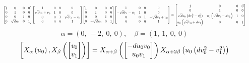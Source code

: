 \documentclass[11pt]{article}
\theoremstyle{definition}
\begin{document}
\[
\scaletoalign{\textwidth}{{\left[\begin{matrix}1 & 0 & 0 & 0\\0 & 1 & 0 & 0\\0 & 0 & 1 & 0\\0 & \sqrt{d} u_{0} & 0 & 1\end{matrix}\right]} {\left[\begin{matrix}1 & 0 & 0 & 0\\\sqrt{d} v_{1} + v_{0} & 1 & 0 & 0\\0 & 0 & 1 & \sqrt{d} v_{1} - v_{0}\\0 & 0 & 0 & 1\end{matrix}\right]} {\left[\begin{matrix}1 & 0 & 0 & 0\\0 & 1 & 0 & 0\\0 & 0 & 1 & 0\\0 & - \sqrt{d} u_{0} & 0 & 1\end{matrix}\right]} {\left[\begin{matrix}1 & 0 & 0 & 0\\- \sqrt{d} v_{1} - v_{0} & 1 & 0 & 0\\0 & 0 & 1 & - \sqrt{d} v_{1} + v_{0}\\0 & 0 & 0 & 1\end{matrix}\right]} = {\left[\begin{matrix}1 & 0 & 0 & 0\\0 & 1 & 0 & 0\\\sqrt{d} u_{0} \left(d v_{1}^{2} - v_{0}^{2}\right) & u_{0} \left(\sqrt{d} v_{0} - d v_{1}\right) & 1 & 0\\u_{0} \left(\sqrt{d} v_{0} + d v_{1}\right) & 0 & 0 & 1\end{matrix}\right]}}
\]
\[
\alpha = \left( 0, \  -2, \  0, \  0\right), \quad \beta = \left( 1, \  1, \  0, \  0\right)
\]
\[
\scaletoalign{\textwidth}{\left[ X_{\alpha}\left(u_{0}\right), X_{\beta}\left(\left[\begin{matrix}v_{0}\\v_{1}\end{matrix}\right]\right) \right] = X_{\alpha + \beta}\left(\left[\begin{matrix}- d u_{0} v_{0}\\u_{0} v_{1}\end{matrix}\right]\right) X_{\alpha + 2\beta}\left(u_{0} \left(d v_{0}^{2} - v_{1}^{2}\right)\right)}
\]
\end{document}
